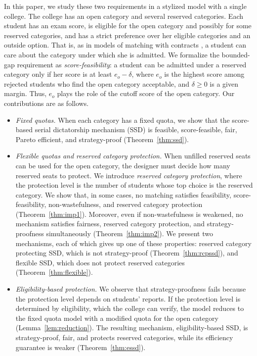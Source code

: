 \documentclass[a4paper,twoside]{article}
\theoremstyle{definition}
\begin{document}
In this paper, we study these two requirements in a stylized model with a single
college. The college has an open category and several reserved categories.
Each student has an exam score, is eligible for the open category and possibly for some
reserved categories, and has a strict preference over her eligible categories and an
outside option.
That is, as in models of matching with contracts \cite{HaMi05a,AyTu20a}, a student can
care about the category under which she is admitted.
We formalize the bounded-gap requirement as \emph{score-feasibility}: a student can be
admitted under a reserved category only if her score is at least $e_o-\delta$, where
$e_o$ is the highest score among rejected students who find the open category
acceptable, and $\delta\ge 0$ is a given margin.
Thus, $e_o$ plays the role of the cutoff score of the open category.
Our contributions are as follows.
\begin{itemize}
\item \emph{Fixed quotas.} When each category has a fixed quota, we show that the
score-based serial dictatorship mechanism (SSD) is feasible, score-feasible, fair,
Pareto efficient, and strategy-proof (Theorem~\ref{thm:ssd}).
\item \emph{Flexible quotas and reserved category protection.} When unfilled reserved
seats can be used for the open category, the designer must decide how many reserved
seats to protect. We introduce \emph{reserved category protection}, where the
protection level is the number of students whose top choice is the reserved category.
We show that, in some cases, no matching satisfies feasibility, score-feasibility,
non-wastefulness, and reserved category protection (Theorem~\ref{thm:imp1}).
Moreover, even if non-wastefulness is weakened, no mechanism satisfies fairness,
reserved category protection, and strategy-proofness simultaneously
(Theorem~\ref{thm:imp2}).
We present two mechanisms, each of which gives up one of these properties: reserved category protecting
SSD, which is not strategy-proof (Theorem~\ref{thm:rcpssd}), and flexible SSD, which
does not protect reserved categories (Theorem~\ref{thm:flexible}).
\item \emph{Eligibility-based protection.} We observe that strategy-proofness fails
because the protection level depends on students' reports. If the protection level is
determined by eligibility, which the college can verify, the model reduces to the fixed
quota model with a modified quota for the open category
(Lemma~\ref{lem:reduction}). The resulting mechanism, eligibility-based SSD, is
strategy-proof, fair, and protects reserved categories, while its efficiency guarantee
is weaker (Theorem~\ref{thm:essd}).
\end{itemize}
\end{document}
